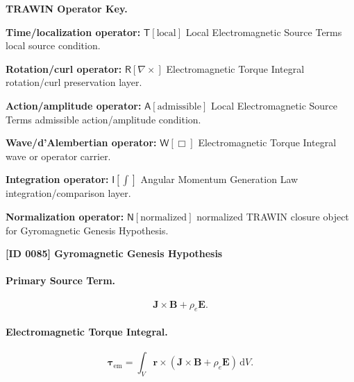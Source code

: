 \par\vspace{0.45\baselineskip}
\noindent\begin{minipage}[t]{\linewidth}
\begingroup
\small
\raggedright
\textbf{TRAWIN Operator Key.}\par
\noindent\textbf{Time/localization operator:} $\mathsf{T}\!\left[\mathrm{local}\right]$ Local Electromagnetic Source Terms local source condition.\par
\noindent\textbf{Rotation/curl operator:} $\mathsf{R}\!\left[\nabla\times\right]$ Electromagnetic Torque Integral rotation/curl preservation layer.\par
\noindent\textbf{Action/amplitude operator:} $\mathsf{A}\!\left[\mathrm{admissible}\right]$ Local Electromagnetic Source Terms admissible action/amplitude condition.\par
\noindent\textbf{Wave/d'Alembertian operator:} $\mathsf{W}\!\left[\Box\right]$ Electromagnetic Torque Integral wave or operator carrier.\par
\noindent\textbf{Integration operator:} $\mathsf{I}\!\left[\int\right]$ Angular Momentum Generation Law integration/comparison layer.\par
\noindent\textbf{Normalization operator:} $\mathsf{N}\!\left[\mathrm{normalized}\right]$ normalized TRAWIN closure object for Gyromagnetic Genesis Hypothesis.\par
\endgroup
\end{minipage}

\clearpage
\noindent\textbf{[ID 0085] Gyromagnetic Genesis Hypothesis}\par
\vspace{0.35em}
\paragraph{Primary Source Term.}
\begin{equation}
\mathbf{J}\times\mathbf{B}
+
\rho_e\mathbf{E}.
\end{equation}

\paragraph{Electromagnetic Torque Integral.}
\begin{equation}
\boldsymbol{\tau}_{\mathrm{em}}
=
\int_V
\mathbf{r}\times
\left(
\mathbf{J}\times\mathbf{B}
+
\rho_e\mathbf{E}
\right)
\,\mathrm{d}V .
\end{equation}

